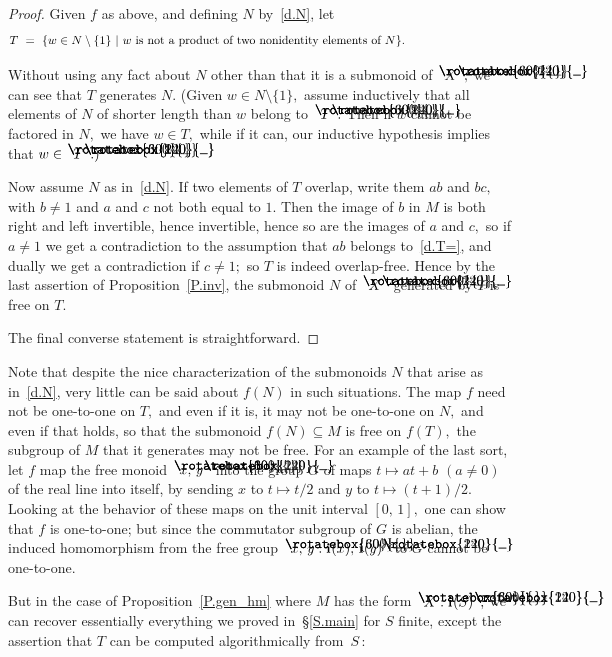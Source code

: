 \documentclass{amsart}
\numberwithin{equation}{section}
\newcommand{\I}{\mathbf{i}\hspace{.05em}}
\newcommand{\langl}{\begin{picture}(.51em,1em)
\put(.11em,.33em){\rotatebox{60}{\line(1,0){.55em}}}
\put(.11em,.33em){\rotatebox{300}{\line(1,0){.55em}}}
\end{picture}}
\newcommand{\rangl}{\begin{picture}(.5em,1em)
\put(.09em,.33em){\rotatebox{120}{\line(1,0){.55em}}}
\put(.09em,.33em){\rotatebox{240}{\line(1,0){.55em}}}
\end{picture}}
\begin{document}
\begin{proof}
Given $f$ as above, and defining $N$ by~\eqref{d.N}, let
%
\begin{equation}\begin{minipage}[c]{35pc}\label{d.T=}
$T \ = \ \{w\in N\setminus\{1\}~|~w$ is not a product
of two nonidentity elements of $N\}.$
\end{minipage}\end{equation}

Without using any fact about $N$ other than that it is
a submonoid of $\langl X\rangl,$ we can see that $T$ generates $N.$
(Given $w\in N\setminus\{1\},$ assume inductively that all elements
of $N$ of shorter length than $w$ belong to $\langl T\rangl.$
Then if $w$ cannot be factored in $N,$ we have $w\in T,$
while if it can, our inductive hypothesis implies that
$w\in\langl T\rangl.)$

Now assume $N$ as in~\eqref{d.N}.
If two elements of $T$ overlap, write them $ab$ and $bc,$
with $b\neq 1$ and $a$ and $c$ not both equal to $1.$
Then the image of $b$ in $M$ is both right and left
invertible, hence invertible, hence so are the images
of $a$ and $c,$ so if $a\neq 1$ we get
a contradiction to the assumption that $ab$ belongs to~\eqref{d.T=},
and dually we get a contradiction
if $c\neq 1;$ so $T$ is indeed overlap-free.
Hence by the last assertion of Proposition~\ref{P.inv},
the submonoid $N$ of $\langl X\rangl$ generated by $T$ is free on $T.$

The final converse statement is straightforward.
\end{proof}

Note that despite the nice characterization of
the submonoids $N$ that arise as in~\eqref{d.N}, very
little can be said about $f(N)$ in such situations.
The map $f$ need not be one-to-one on $T,$ and even if it is,
it may not be one-to-one on $N,$ and even if that holds,
so that the submonoid $f(N)\subseteq M$ is free on $f(T),$
the subgroup of $M$ that it generates may not be free.
For an example of the last sort, let $f$
map the free monoid $\langl x,\,y\rangl$ into the group
$G$ of maps $t\mapsto at+b$ $(a\neq 0)$ of the real line into itself,
by sending $x$ to $t\mapsto t/2$ and $y$ to $t\mapsto (t+1)/2.$
Looking at the behavior of these maps on the unit interval $[0,\,1],$
one can show that $f$ is one-to-one; but since the commutator subgroup
of $G$ is abelian, the induced homomorphism from the free group
$\langl x,\,y : \I(x),\,\I(y)\rangl$ to $G$ cannot be one-to-one.

But in the case of Proposition~\ref{P.gen_hm} where
$M$ has the form $\langl X:\I(S)\rangl,$ we can recover essentially
everything we proved in~\S\ref{S.main} for $S$ finite, except the
assertion that $T$ can be computed algorithmically from~$S\,{:}$
\end{document}
